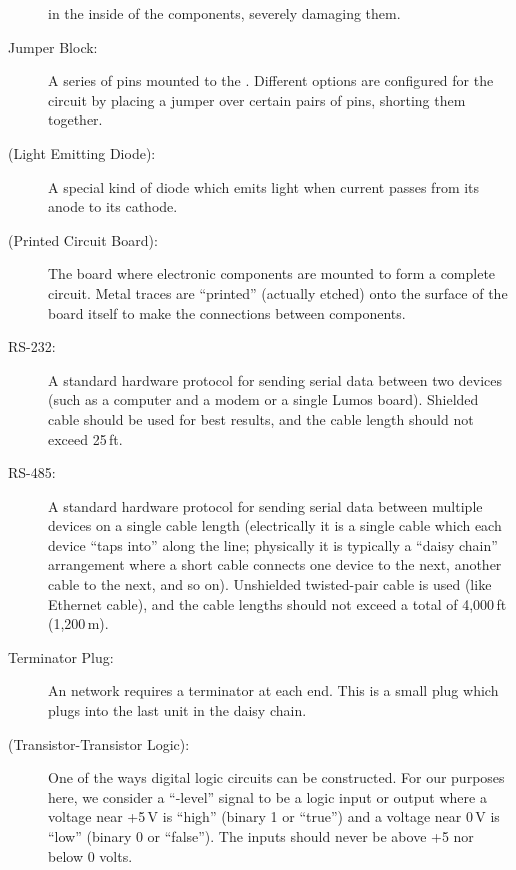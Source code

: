 \documentclass[letterpaper,twoside,onecolumn,openright,final]{memoir}
\begin{document}
\begin{description}
		in the inside of the components, severely damaging them.
	\item[Jumper Block:]
		A series of pins mounted to the .  Different options are configured for the
		circuit by placing a jumper over certain pairs of pins, shorting them together.
	\item[\acronym{LED} (Light Emitting Diode):]
		A special kind of diode which emits light when current passes from its anode to its cathode.
	\item[\acronym{PCB} (Printed Circuit Board):]
		The board where electronic components are mounted to form a complete circuit.  Metal
		traces are ``printed'' (actually etched) onto the surface of the board itself to make the
		connections between components.
	\item[RS-232:]
		A standard hardware protocol for sending serial data between two devices (such as a computer
		and a modem or a single Lumos board).  Shielded cable should be used for best results, and
		the cable length should not exceed 25\,ft.
	\item[RS-485:]
		A standard hardware protocol for sending serial data between multiple devices on a single
		cable length (electrically it is a single cable which each device ``taps into'' along the
		line; physically it is typically a ``daisy chain'' arrangement where a short cable connects
		one device to the next, another cable to the next, and so on). Unshielded twisted-pair cable
		is used (like Ethernet cable), and the cable lengths should not exceed a total of 4,000\,ft
		(1,200\,m).
	\item[Terminator Plug:]
		An  network requires a terminator at each end.  This is a small plug which plugs into
		the last unit in the daisy chain.
	\item[\acronym{TTL} (Transistor-Transistor Logic):] One of the ways digital logic circuits can be
		constructed.  For our purposes here, we consider a ``-level'' signal to be a
		logic input or output where a voltage near +5\,V is ``high'' (binary 1 or ``true'') and a
		voltage near 0\,V is ``low'' (binary 0 or ``false'').  The inputs should never be above
		+5 nor below 0 volts.
\end{description}

 

\indexintoc
\printindex
\clearpage


\end{document}
